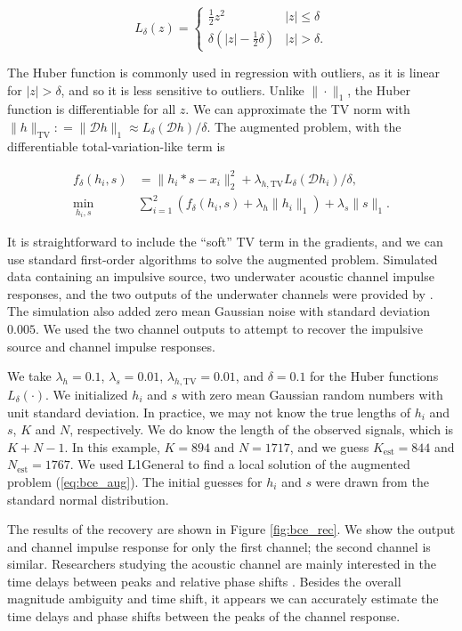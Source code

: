 \documentclass[journal]{IEEEtran}
\newcommand{\defeq}{\mathrel{\mathop:}=}
\begin{document}
\[ L_\delta(z) = \left\{\begin{array}{ll} \frac{1}{2}z^2 & |z| \le \delta\\ \delta\left(|z| - \frac{1}{2}\delta\right) & |z| > \delta. \end{array}\right. \] 

\noindent The Huber function is commonly used in regression with outliers, as it is linear for $|z|>\delta$, and so it is less sensitive to outliers.  Unlike ${\|\cdot\|_1}$, the Huber function is differentiable for all $z$.  We can approximate the TV norm with ${\|h\|_\text{TV} \defeq\|\mathcal{D}h\|_1 \approx L_\delta(\mathcal{D}h)/\delta}$.  The augmented problem, with the differentiable total-variation-like term is

\begin{align}
   \label{eq:bce_aug}
   f_\delta(h_i,s) &= \|h_i\ast s - x_i\|_2^2 + \lambda_{h,\text{TV}}L_\delta(\mathcal{D}h_i)/\delta,\nonumber\\
   \min_{h_i,s} ~&\sum_{i=1}^2\left(f_\delta(h_i,s) + \lambda_h\|h_i\|_1\right) + \lambda_s\|s\|_1.
\end{align}

It is straightforward to include the ``soft'' TV term in the gradients, and we can use standard first-order algorithms to solve the augmented problem.  Simulated data containing an impulsive source, two underwater acoustic channel impulse responses, and the two outputs of the underwater channels were provided by \cite{rideout_2016}.  The simulation also added zero mean Gaussian noise with standard deviation $0.005$.  We used the two channel outputs to attempt to recover the impulsive source and channel impulse responses.

We take $\lambda_h = 0.1$, $\lambda_s=0.01$, $\lambda_{h,\text{TV}}=0.01$, and $\delta=0.1$ for the Huber functions $L_\delta(\cdot)$.  We initialized $h_i$ and $s$ with zero mean Gaussian random numbers with unit standard deviation.  In practice, we may not know the true lengths of $h_i$ and $s$, $K$ and $N$, respectively.  We do know the length of the observed signals, which is $K+N-1$.  In this example, $K=894$ and $N=1717$, and we guess $K_\text{est}=844$ and $N_\text{est}=1767$.  We used L1General \cite{schmidt_2010} to find a local solution of the augmented problem (\ref{eq:bce_aug}).  The initial guesses for $h_i$ and $s$ were drawn from the standard normal distribution.

The results of the recovery are shown in Figure \ref{fig:bce_rec}.  We show the output and channel impulse response for only the first channel; the second channel is similar.  Researchers studying the acoustic channel are mainly interested in the time delays between peaks and relative phase shifts \cite{rideout_2016}.  Besides the overall magnitude ambiguity and time shift, it appears we can accurately estimate the time delays and phase shifts between the peaks of the channel response.
\end{document}
